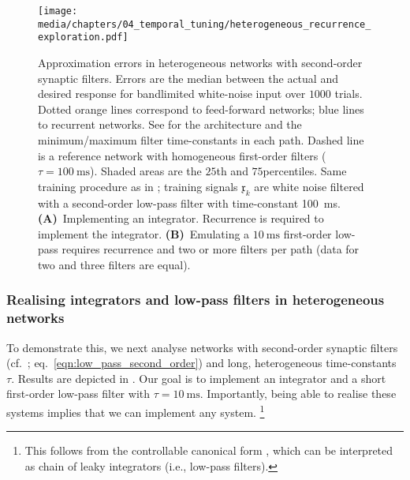 \begin{figure}
	\centering
	\texttt{[image: media/chapters/04\_temporal\_tuning/heterogeneous\_recurrence\_exploration.pdf]}
	\caption[Approximation errors in heterogeneous networks with second-order synaptic filters]{Approximation errors in heterogeneous networks with second-order synaptic filters.
	Errors are the median \NRMSE between the actual and desired response for bandlimited white-noise input over $1000$ trials.
	Dotted orange lines correspond to feed-forward networks; blue lines to recurrent networks.
	See  for the architecture and the minimum/maximum filter time-constants in each path.
	Dashed line is a reference network with homogeneous first-order filters ($\tau = \SI{100}{\milli\second}$).
	Shaded areas are the $25$th and $75$percentiles.
	Same training procedure as in ; training signals $\mathfrak{x}_k$ are white noise filtered with a second-order low-pass filter with time-constant \SI{100}{\milli\second}.
	\textbf{(A)}~Implementing an integrator.
	Recurrence is required to implement the integrator.
	\textbf{(B)}~Emulating a $\SI{10}{\milli\second}$ first-order low-pass requires recurrence and two or more filters per path (data for two and three filters are equal).
	}
	\label{fig:heterogeneous_recurrence_exploration}
\end{figure}

\subsubsection{Realising integrators and low-pass filters in heterogeneous networks}
To demonstrate this, we next analyse networks with second-order synaptic filters (cf.~; eq.~\ref{eqn:low_pass_second_order}) and long, heterogeneous time-constants $\tau$.
Results are depicted in .
Our goal is to implement an integrator and a short first-order low-pass filter with $\tau = \SI{10}{\milli\second}$.
Importantly, being able to realise these systems implies that we can implement any \LTI system.%
\footnote{This follows from the controllable canonical form \citep[cf.][Section~3.4.4]{verhaegen2007filtering}, which can be interpreted as chain of leaky integrators (i.e., low-pass filters).}

